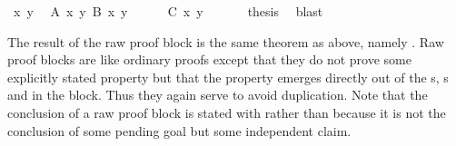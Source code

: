 \begin{isabellebody}
\ x\ y\ \isamarkupfalse%
\ {\isachardoublequote}A\ x\ y{\isachardoublequote}\ {\isachardoublequote}B\ x\ y{\isachardoublequote}\isanewline
\ \ \ \ \isamarkupfalse%
\ {\isachardoublequote}C\ x\ y{\isachardoublequote}\ \isamarkupfalse%
\ \isamarkupfalse%
\isacommand{{\isacharbraceright}}\isanewline
\ \ \isamarkupfalse%
\ {\isacharquery}thesis\ \isamarkupfalse%
\ blast\isanewline
\isamarkupfalse%
\isamarkupfalse%
%
\begin{isamarkuptext}%
\noindent The result of the raw proof block is the same theorem
as above, namely .  Raw
proof blocks are like ordinary proofs except that they do not prove
some explicitly stated property but that the property emerges directly
out of the s, s and
 in the block. Thus they again serve to avoid
duplication. Note that the conclusion of a raw proof block is stated with
 rather than  because it is not the
conclusion of some pending goal but some independent claim.


\end{isamarkuptext}
\end{isabellebody}
